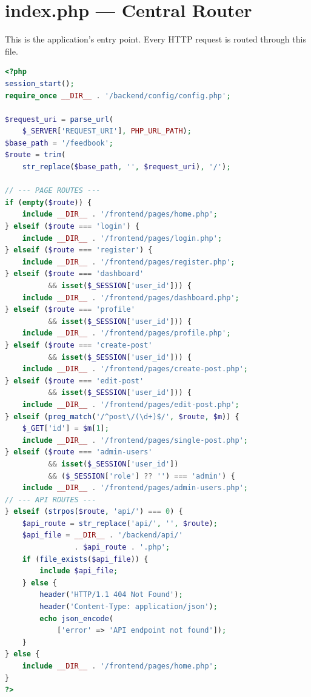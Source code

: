 \documentclass[12pt,a4paper]{report}
\begin{document}
\section{index.php --- Central Router}
This is the application's entry point. Every HTTP request is routed through this file.

\begin{lstlisting}[language=PHP]
<?php
session_start();
require_once __DIR__ . '/backend/config/config.php';

$request_uri = parse_url(
    $_SERVER['REQUEST_URI'], PHP_URL_PATH);
$base_path = '/feedbook';
$route = trim(
    str_replace($base_path, '', $request_uri), '/');

// --- PAGE ROUTES ---
if (empty($route)) {
    include __DIR__ . '/frontend/pages/home.php';
} elseif ($route === 'login') {
    include __DIR__ . '/frontend/pages/login.php';
} elseif ($route === 'register') {
    include __DIR__ . '/frontend/pages/register.php';
} elseif ($route === 'dashboard'
          && isset($_SESSION['user_id'])) {
    include __DIR__ . '/frontend/pages/dashboard.php';
} elseif ($route === 'profile'
          && isset($_SESSION['user_id'])) {
    include __DIR__ . '/frontend/pages/profile.php';
} elseif ($route === 'create-post'
          && isset($_SESSION['user_id'])) {
    include __DIR__ . '/frontend/pages/create-post.php';
} elseif ($route === 'edit-post'
          && isset($_SESSION['user_id'])) {
    include __DIR__ . '/frontend/pages/edit-post.php';
} elseif (preg_match('/^post\/(\d+)$/', $route, $m)) {
    $_GET['id'] = $m[1];
    include __DIR__ . '/frontend/pages/single-post.php';
} elseif ($route === 'admin-users'
          && isset($_SESSION['user_id'])
          && ($_SESSION['role'] ?? '') === 'admin') {
    include __DIR__ . '/frontend/pages/admin-users.php';
// --- API ROUTES ---
} elseif (strpos($route, 'api/') === 0) {
    $api_route = str_replace('api/', '', $route);
    $api_file = __DIR__ . '/backend/api/'
                . $api_route . '.php';
    if (file_exists($api_file)) {
        include $api_file;
    } else {
        header('HTTP/1.1 404 Not Found');
        header('Content-Type: application/json');
        echo json_encode(
            ['error' => 'API endpoint not found']);
    }
} else {
    include __DIR__ . '/frontend/pages/home.php';
}
?>
\end{lstlisting}
\end{document}
